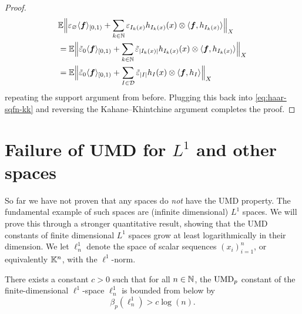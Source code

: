 \begin{proof}
  \begin{equation*}
    \begin{aligned}
    &\mathbb{E} \Big\| \varepsilon_{\varnothing} \langle \bm{f} \rangle_{[0,1)} +\sum_{k \in \mathbb{N}} \varepsilon_{I_{k}(x)} h_{I_{k}(x)}(x) \otimes \langle \bm{f}, h_{I_{k}(x)} \rangle \Big\|_{X} \\
    &= \mathbb{E} \Big\| \tilde{\varepsilon}_{0} \langle \bm{f} \rangle_{[0,1)} + \sum_{k \in \mathbb{N}} \tilde{\varepsilon}_{|I_{k}(x)|} h_{I_{k}(x)}(x) \otimes \langle \bm{f}, h_{I_{k}(x)} \rangle \Big\|_{X} \\
    &= \mathbb{E} \Big\| \tilde{\varepsilon}_{0} \langle \bm{f} \rangle_{[0,1)} + \sum_{I \in \mathcal{D}} \tilde{\varepsilon}_{|I|} h_{I}(x) \otimes \langle \bm{f}, h_{I} \rangle \Big\|_{X}
  \end{aligned}
  \end{equation*}
  repeating the support argument from before.
  Plugging this back into \eqref{eq:haar-sqfn-kk} and reversing the Kahane--Khintchine argument completes the proof.
\end{proof}

\section{Failure of UMD for $L^1$ and other spaces}

So far we have not proven that any spaces do \emph{not} have the UMD property.
The fundamental example of such spaces are (infinite dimensional) $L^1$ spaces.
We will prove this through a stronger quantitative result, showing that the UMD constants of finite dimensional $L^1$ spaces grow at least logarithmically in their dimension.
We let $\ell^1_{n}$ denote the space of scalar sequences $(x_{i})_{i=1}^{n}$, or equivalently $\mathbb{K}^n$, with the $\ell^1$-norm.

\begin{thm}\label{thm:L1-not-UMD}
  There exists a constant $c > 0$ such that for all $n \in \mathbb{N}$, the $\mathrm{UMD}_{p}$ constant of the finite-dimensional $\ell^1$-space $\ell^{1}_{n}$ is bounded from below by
  \begin{equation*}
    \beta_{p}(\ell^{1}_{n}) > c\log(n).
  \end{equation*}
\end{thm}


